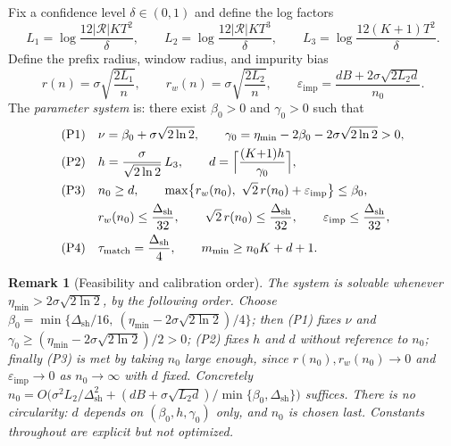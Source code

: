 \documentclass[11pt]{article}
\newtheorem{remark}{Remark}
\newcommand{\Rcal}{\mathcal R}
\newcommand{\eimp}{\varepsilon_{\mathrm{imp}}}
\newcommand{\dsh}{\Delta_{\mathrm{sh}}}
\newcommand{\taum}{\tau_{\mathrm{match}}}
\begin{document}
Fix a confidence level $\delta\in(0,1)$ and define the log factors
\begin{equation}
    L_1=\log\frac{12|\Rcal|KT^2}{\delta},
    \qquad
    L_2=\log\frac{12|\Rcal|KT^3}{\delta},
    \qquad
    L_3=\log\frac{12(K{+}1)T^2}{\delta}.
    \label{eq:logs}
\end{equation}
Define the prefix radius, window radius, and impurity bias
\begin{equation}
    r(n)=\sigma\sqrt{\frac{2L_1}{n}},
    \qquad
    r_w(n)=\sigma\sqrt{\frac{2L_2}{n}},
    \qquad
    \eimp=\frac{dB+2\sigma\sqrt{2L_2 d}}{n_0}.
    \label{eq:radii}
\end{equation}
The \emph{parameter system} is: there exist $\beta_0>0$ and $\gamma_0>0$ such that
\begin{equation}
\begin{aligned}
&\text{(P1)}\quad \nu=\beta_0+\sigma\sqrt{2\ln 2},
\qquad
\gamma_0=\eta_{\min}-2\beta_0-2\sigma\sqrt{2\ln 2}>0,\\
&\text{(P2)}\quad h=\frac{\sigma}{\sqrt{2\ln2}}\,L_3,
\qquad
d=\Bigl\lceil\frac{(K{+}1)h}{\gamma_0}\Bigr\rceil,\\
&\text{(P3)}\quad n_0\ge d,
\qquad
\max\bigl\{r_w(n_0),\ \sqrt2\,r(n_0)+\eimp\bigr\}\le\beta_0,\\
&\phantom{\text{(P3)}}\quad
r_w(n_0)\le\frac{\dsh}{32},
\qquad
\sqrt2\,r(n_0)\le\frac{\dsh}{32},
\qquad
\eimp\le\frac{\dsh}{32},\\
&\text{(P4)}\quad \taum=\frac{\dsh}{4},
\qquad
m_{\min}\ge n_0K+d+1 .
\end{aligned}
\label{eq:param_system}
\end{equation}

\begin{remark}[Feasibility and calibration order]
\label{rem:feasibility}
The system is solvable whenever $\eta_{\min}>2\sigma\sqrt{2\ln2}$, by the following order. Choose $\beta_0=\min\{\dsh/16,\ (\eta_{\min}-2\sigma\sqrt{2\ln2})/4\}$; then (P1) fixes $\nu$ and $\gamma_0\ge(\eta_{\min}-2\sigma\sqrt{2\ln2})/2>0$; (P2) fixes $h$ and $d$ without reference to $n_0$; finally (P3) is met by taking $n_0$ large enough, since $r(n_0),r_w(n_0)\to0$ and $\eimp\to0$ as $n_0\to\infty$ with $d$ fixed. Concretely $n_0=O\bigl(\sigma^2L_2/\dsh^2+(dB+\sigma\sqrt{L_2d})/\min\{\beta_0,\dsh\}\bigr)$ suffices. There is no circularity: $d$ depends on $(\beta_0,h,\gamma_0)$ only, and $n_0$ is chosen last. Constants throughout are explicit but not optimized.
\end{remark}
\end{document}
